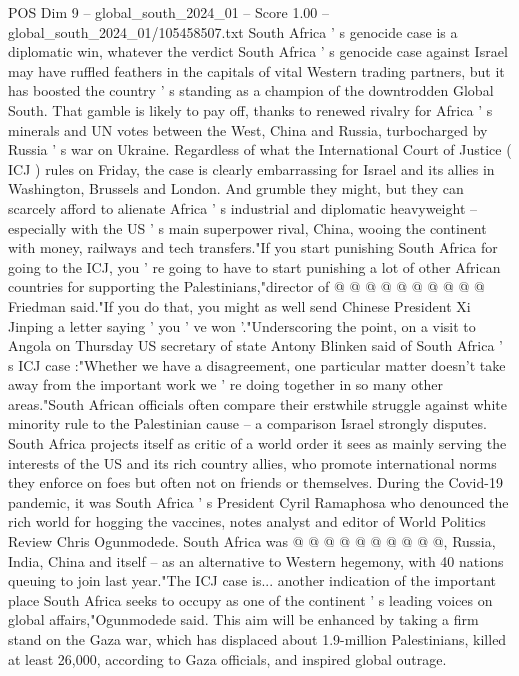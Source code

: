 \begin{textsample}{POS Dim 9 – global\_south\_2024\_01 – Score 1.00 – global\_south\_2024\_01/105458507.txt}  \label{ex:f9_pos_023}
South Africa ' s genocide case is a diplomatic win, whatever the verdict South Africa ' s genocide case against Israel may have ruffled feathers in the capitals of vital Western trading partners, but it has boosted the country ' s standing as a champion of the downtrodden Global South.
That gamble is likely to pay off, thanks to renewed rivalry for Africa ' s minerals and UN votes between the West, China and Russia, turbocharged by Russia ' s war on Ukraine.
Regardless of what the International Court of Justice ( ICJ ) rules on Friday, the case is clearly embarrassing for Israel and its allies in Washington, Brussels and London.
And grumble they might, but they can scarcely afford to alienate Africa ' s industrial and diplomatic heavyweight -- especially with the US ' s main superpower rival, China, wooing the continent with money, railways and tech transfers."If you start punishing South Africa for going to the ICJ, you ' re going to have to start punishing a lot of other African countries for supporting the Palestinians,"director of @ @ @ @ @ @ @ @ @ @ Friedman said."If you do that, you might as well send Chinese President Xi Jinping a letter saying ' you ' ve won '."Underscoring the point, on a visit to Angola on Thursday US secretary of state Antony Blinken said of South Africa ' s ICJ case :"Whether we have a disagreement, one particular matter doesn't take away from the important work we ' re doing together in so many other areas."South African officials often compare their erstwhile struggle against white minority rule to the Palestinian cause -- a comparison Israel strongly disputes.
South Africa projects itself as critic of a world order it sees as mainly serving the interests of the US and its rich country allies, who promote international norms they enforce on foes but often not on friends or themselves.
During the Covid-19 pandemic, it was South Africa ' s President Cyril Ramaphosa who denounced the rich world for hogging the vaccines, notes analyst and editor of World Politics Review Chris Ogunmodede.
South Africa was @ @ @ @ @ @ @ @ @ @, Russia, India, China and itself -- as an alternative to Western hegemony, with 40 nations queuing to join last year."The ICJ case is... another indication of the important place South Africa seeks to occupy as one of the continent ' s leading voices on global affairs,"Ogunmodede said.
This aim will be enhanced by taking a firm stand on the Gaza war, which has displaced about 1.9-million Palestinians, killed at least 26,000, according to Gaza officials, and inspired global outrage.

\end{textsample}
